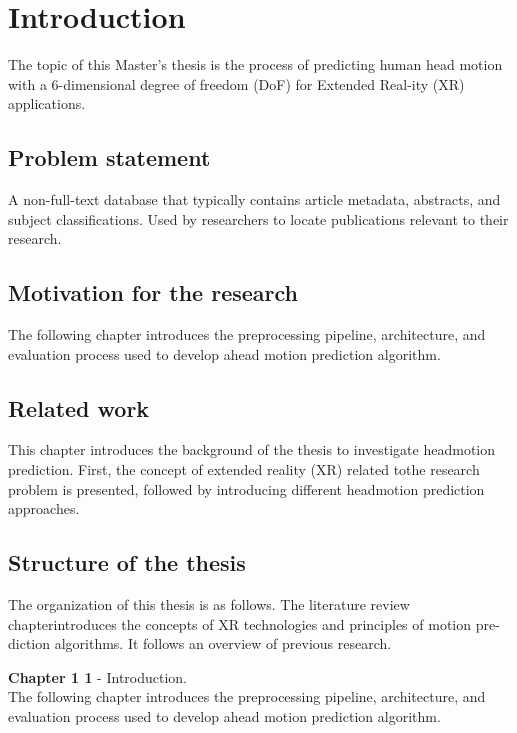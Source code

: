 \chapter{Introduction}
\label{sec:intro}
The topic of this Master’s thesis is the process of predicting human head motion with a 6-dimensional degree of freedom (DoF) for Extended Real-ity (XR) applications. 


\section{Problem statement}
\label{sec:intro:problem}
A non-full-text database that typically contains article metadata, abstracts, and subject classifications. Used by researchers to locate publications relevant to their research.

\section{Motivation for the research}
\label{sec:intro:motivation}
The following chapter introduces the preprocessing pipeline, architecture, and evaluation process used to develop ahead motion prediction algorithm.

\section{Related work}
\label{sec:intro:related}

This chapter introduces the background of the thesis to investigate headmotion prediction. First, the concept of extended reality (XR) related tothe research problem is presented, followed by introducing different headmotion prediction approaches.

\section{Structure of the thesis}
\label{sec:intro:structure}
The organization of this thesis is as follows. The literature review chapterintroduces the concepts of XR technologies and principles of motion pre-diction algorithms. It follows an overview of previous research. 

\textbf{Chapter 1 1} - Introduction.\\
The following chapter introduces the preprocessing pipeline, architecture, and evaluation process used to develop ahead motion prediction algorithm.




